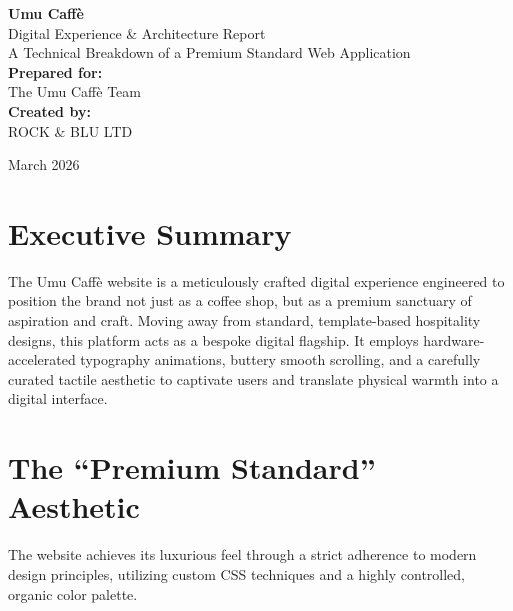 \documentclass[11pt, a4paper]{article}
\begin{document}
\pagecolor{umubg}
\color{umufg}

\begin{titlepage}
    \centering
    \vspace*{4cm}
    
    {\Huge \bfseries \textcolor{umuaccent}{Umu Caffè} }\\[1cm]
    {\LARGE Digital Experience \& Architecture Report}\\[0.5cm]
    {\large A Technical Breakdown of a Premium Standard Web Application}\\[3cm]
    
    {\large \textbf{Prepared for:}}\\[0.2cm]
    {\large The Umu Caffè Team}\\[2cm]
    
    {\large \textbf{Created by:}}\\[0.2cm]
    {\large ROCK \& BLU LTD}\\[2cm]
    
    \vfill
    
    {\large March 2026}\\[1cm]
\end{titlepage}


\section{Executive Summary}
The Umu Caffè website is a meticulously crafted digital experience engineered to position the brand not just as a coffee shop, but as a premium sanctuary of aspiration and craft. Moving away from standard, template-based hospitality designs, this platform acts as a bespoke digital flagship. It employs hardware-accelerated typography animations, buttery smooth scrolling, and a carefully curated tactile aesthetic to captivate users and translate physical warmth into a digital interface.

\section{The ``Premium Standard'' Aesthetic}
The website achieves its luxurious feel through a strict adherence to modern design principles, utilizing custom CSS techniques and a highly controlled, organic color palette.
\end{document}
